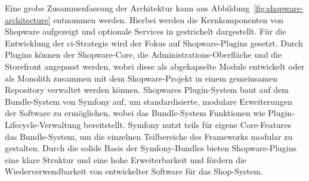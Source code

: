 Eine grobe Zusammenfassung der Architektur kann aus Abbildung\ \ref{fig:shopware-architecture} entnommen werden.
Hierbei werden die Kernkomponenten von Shopware aufgezeigt und optionale Services in gestrichelt dargestellt.
Für die Entwicklung der \acrshort{ci}-Strategie wird der Fokus auf Shopware-Plugins gesetzt.
Durch Plugins können der Shopware-Core, die Administrations-Oberfläche und die Storefront angepasst werden, wobei diese
als abgekapselte Module entwickelt oder als Monolith zusammen mit dem Shopware-Projekt in einem gemeinsamen Repository
verwaltet werden können.
Shopwares Plugin-System baut auf dem Bundle-System von Symfony auf, um standardisierte, modulare Erweiterungen der
Software zu ermöglichen, wobei das Bundle-System Funktionen wie Plugin-Lifecycle-Verwaltung bereitstellt.
Symfony nutzt teils für eigene Core-Features das Bundle-System, um die einzelnen Teilbereiche des Frameworks modular zu
gestalten.
Durch die solide Basis der Symfony-Bundles bieten Shopware-Plugins eine klare Struktur und eine hohe Erweiterbarkeit
und fördern die Wiederverwendbarkeit von entwickelter Software für das Shop-System.

\clearpage
